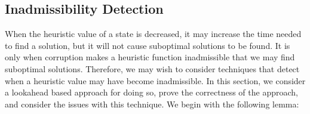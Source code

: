 \documentclass[letterpaper]{article}
\newtheorem{lemma}{Lemma}
\begin{document}






\subsection{Inadmissibility Detection}

When the heuristic value of a state is decreased, it may increase the time needed to find a solution, but it will not cause suboptimal solutions to be found. It is only when corruption makes a heuristic function inadmissible that we may find suboptimal solutions. Therefore, we may wish to consider techniques that detect when a heuristic value may have become inadmissible. In this section, we consider a lookahead based approach for doing so, prove the correctness of the approach, and consider the issues with this technique. We begin with the following lemma:
\end{document}
